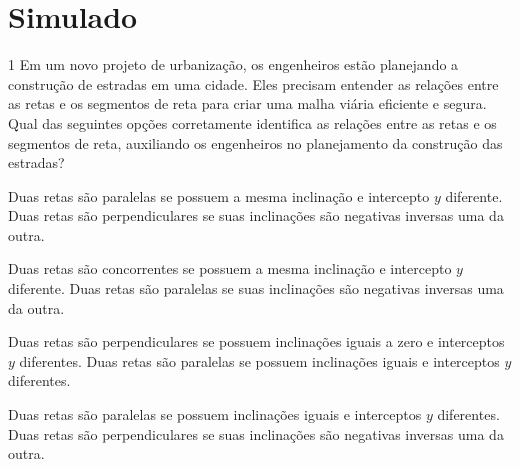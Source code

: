 
\chapter[Simulado 4]{Simulado}

\num{1} Em um novo projeto de urbanização, os engenheiros estão planejando a
construção de estradas em uma cidade. Eles precisam entender as relações entre
as retas e os segmentos de reta para criar uma malha viária eficiente e segura.
Qual das seguintes opções corretamente identifica as relações entre as retas e
os segmentos de reta, auxiliando os engenheiros no planejamento da construção
das estradas?

\begin{escolha}
\item Duas retas são paralelas se possuem a mesma inclinação e intercepto \(y\) diferente. Duas retas são perpendiculares se suas inclinações são negativas inversas uma da outra.

\item Duas retas são concorrentes se possuem a mesma inclinação e intercepto \(y\) diferente. Duas retas são paralelas se suas inclinações são negativas inversas uma da outra.

\item Duas retas são perpendiculares se possuem inclinações iguais a zero e interceptos \(y\) diferentes. Duas retas são paralelas se possuem inclinações iguais e interceptos \(y\) diferentes.

\item Duas retas são paralelas se possuem inclinações iguais e interceptos \(y\) diferentes. Duas retas são perpendiculares se suas inclinações são negativas inversas uma da outra.
\end{escolha}




